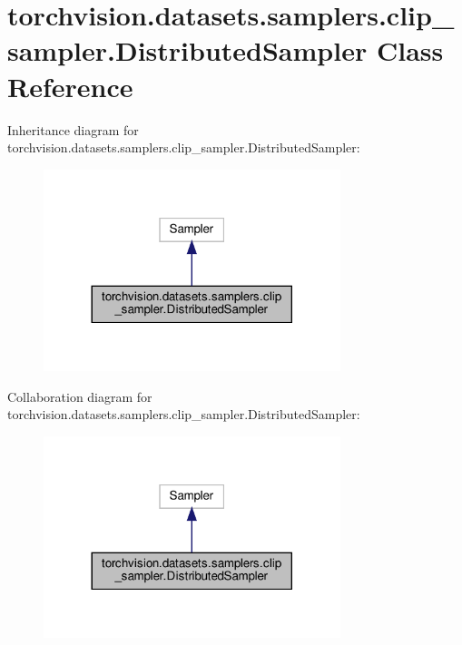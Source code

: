 \hypertarget{classtorchvision_1_1datasets_1_1samplers_1_1clip__sampler_1_1DistributedSampler}{}\section{torchvision.\+datasets.\+samplers.\+clip\+\_\+sampler.\+Distributed\+Sampler Class Reference}
\label{classtorchvision_1_1datasets_1_1samplers_1_1clip__sampler_1_1DistributedSampler}


Inheritance diagram for torchvision.\+datasets.\+samplers.\+clip\+\_\+sampler.\+Distributed\+Sampler\+:
\nopagebreak
\begin{figure}[H]
\begin{center}
\leavevmode
\includegraphics[width=245pt]{classtorchvision_1_1datasets_1_1samplers_1_1clip__sampler_1_1DistributedSampler__inherit__graph}
\end{center}
\end{figure}


Collaboration diagram for torchvision.\+datasets.\+samplers.\+clip\+\_\+sampler.\+Distributed\+Sampler\+:
\nopagebreak
\begin{figure}[H]
\begin{center}
\leavevmode
\includegraphics[width=245pt]{classtorchvision_1_1datasets_1_1samplers_1_1clip__sampler_1_1DistributedSampler__coll__graph}
\end{center}
\end{figure}
